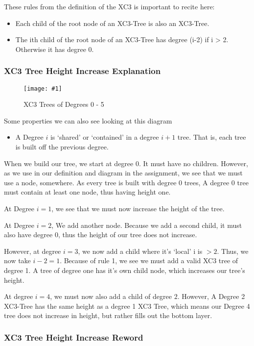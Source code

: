 \documentclass{article}
\newcommand{\figureInsetScaled}[3]
{
    \FloatBarrier{}
    \figureRaw{#1}{#2}{#3}
    \FloatBarrier{}
}
\newcommand{\figureRaw}[3]
{
    \begin{figure}[ht!]
        \centering
        \texttt{[image: \#1]}
        \caption{#2}
    \end{figure}
}
\begin{document}
These rules from the definition of the XC3 is important to recite here:

\begin{itemize}
    \item Each child of the root node of an XC3-Tree is also an XC3-Tree.
    \item The ith child of the root node of an XC3-Tree has degree (i-2) if i > 2. Otherwise it has degree 0.
\end{itemize}

\subsubsection{XC3 Tree Height Increase Explanation}

\figureInsetScaled{images/experiment3/points.png}{XC3 Trees of Degrees 0 - 5}{0.65}

Some properties we can also see looking at this diagram
\begin{itemize}
    \item A Degree $i$ is `shared' or `contained' in a degree $i+1$ tree. That is, each tree is built off the previous degree.
\end{itemize}

When we build our tree, we start at degree 0. It must have no children. However, as we use in our definition and diagram in the assignment, we see that we must use a node, somewhere. As every tree is built with degree 0 trees, A degree 0 tree must contain at least one node, thus having height one.

At Degree $i=1$, we see that we must now increase the height of the tree.

At Degree $i=2$, We add another node. Because we add a second child, it must also have degree 0, thus the height of our tree does not increase.

However, at degree $i=3$, we now add a child where it's `local' i is $>2$. Thus, we now take $i-2 = 1$. Because of rule 1, we see we must add a valid XC3 tree of degree 1. A tree of degree one has it's own child node, which increases our tree's height.

At degree $i=4$, we must now also add a child of degree $2$. However, A Degree 2 XC3-Tree has the same height as a degree 1 XC3 Tree, which means our Degree 4 tree does not increase in height, but rather fills out the bottom layer.

\subsubsection{XC3 Tree Height Increase Reword}
\end{document}
